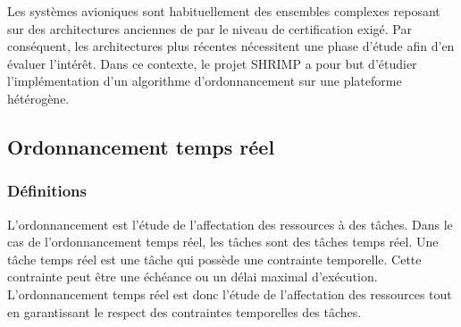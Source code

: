 







Les systèmes avioniques sont habituellement des ensembles complexes reposant sur des architectures anciennes de par le niveau de certification exigé. Par conséquent, les architectures plus récentes nécessitent une phase d'étude afin d'en évaluer l'intérêt. Dans ce contexte, le projet SHRIMP a pour but d'étudier l'implémentation d'un algorithme d'ordonnancement sur une plateforme hétérogène.   

\subsection{Ordonnancement temps réel}

\subsubsection{Définitions}
L'ordonnancement est l'étude de l'affectation des ressources à des tâches. Dans le cas de l'ordonnancement temps réel, les tâches sont des tâches temps réel. Une tâche temps réel est une tâche qui possède une contrainte temporelle. Cette contrainte peut être une échéance ou un délai maximal d'exécution. L'ordonnancement temps réel est donc l'étude de l'affectation des ressources tout en garantissant le respect des contraintes temporelles des tâches. 

